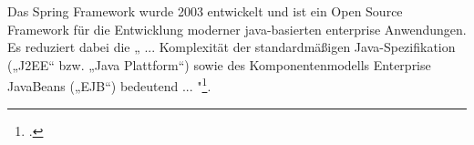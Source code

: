 Das Spring Framework wurde 2003 entwickelt und ist ein Open Source Framework für die Entwicklung moderner java-basierten enterprise Anwendungen. Es reduziert dabei die „ ... Komplexität der standardmäßigen Java-Spezifikation („J2EE“ bzw. „Java Plattform“) sowie des Komponentenmodells Enterprise JavaBeans („EJB“) bedeutend ... "\footcite{springbootionos}.